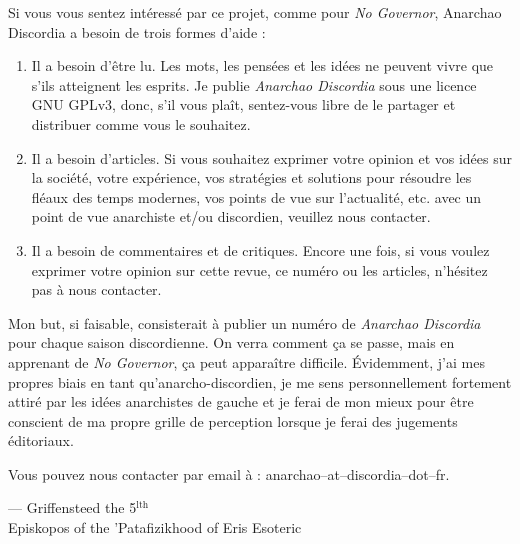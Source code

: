 \documentclass[12pt, onecolumn, letterpaper, oneside]{book}
\begin{document}
Si vous vous sentez intéressé par ce projet, comme pour \emph{No Governor}, Anarchao Discordia a besoin de trois formes d'aide :
\begin{enumerate}
\item Il a besoin d'être lu. Les mots, les pensées et les idées ne peuvent vivre que s'ils atteignent les esprits. Je publie \emph{Anarchao Discordia} sous une licence GNU GPLv3, donc, s'il vous plaît, sentez-vous libre de le partager et distribuer comme vous le souhaitez.
\item Il a besoin d'articles. Si vous souhaitez exprimer votre opinion et vos idées sur la société, votre expérience, vos stratégies et solutions pour résoudre les fléaux des temps modernes, vos points de vue sur l'actualité, etc. avec un point de vue anarchiste et/ou discordien, veuillez nous contacter.
\item Il a besoin de commentaires et de critiques. Encore une fois, si vous voulez exprimer votre opinion sur cette revue, ce numéro ou les articles, n'hésitez pas à nous contacter.
\end{enumerate}

Mon but, si faisable, consisterait à publier un numéro de \emph{Anarchao Discordia} pour chaque saison discordienne. On verra comment ça se passe, mais en apprenant de \emph{No Governor}, ça peut apparaître difficile. Évidemment, j'ai mes propres biais en tant qu'anarcho-discordien, je me sens personnellement fortement attiré par les idées anarchistes de gauche et je ferai de mon mieux pour être conscient de ma propre grille de perception lorsque je ferai des jugements éditoriaux.

Vous pouvez nous contacter par email à : anarchao--at--discordia--dot--fr.

\par\begin{flushright} --- Griffensteed the 5$^\text{lth}$\\ Episkopos of the 'Patafizikhood of Eris Esoteric\end{flushright}










\end{document}
